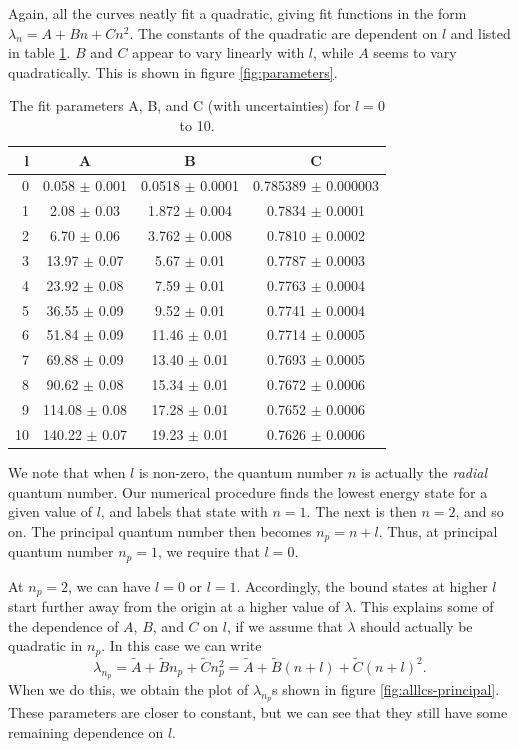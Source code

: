 \documentclass[12pt,twoside]{reedthesis}
\newcommand{\eqn}[1]{\begin{equation}#1\end{equation}}
\begin{document}
Again, all the curves neatly fit a quadratic, giving fit functions in the form $\lambda_n = A + B n + C n^2$. The constants of the quadratic are dependent on $l$ and listed in table \ref{tab:fitparams}. $B$ and $C$ appear to vary linearly with $l$, while $A$ seems to vary quadratically. This is shown in figure \ref{fig:parameters}.

\begin{table}[h]
	\centering
	\caption{The fit parameters A, B, and C (with uncertainties) for $l = 0$ to 10.}
	\label{tab:fitparams}
	\begin{tabular}{r|ccc}
		l	& A	 	& B	 	& C	 \\
		\hline
		0	& 0.058	$\pm$ 0.001	& 0.0518	$\pm$ 0.0001	& 0.785389	$\pm$ 0.000003\\
		1	& 2.08	$\pm$ 0.03	& 1.872	$\pm$ 0.004	& 0.7834	$\pm$ 0.0001\\
		2	& 6.70	$\pm$ 0.06	& 3.762	$\pm$ 0.008	& 0.7810	$\pm$ 0.0002\\
		3	& 13.97	$\pm$ 0.07	& 5.67	$\pm$ 0.01	& 0.7787	$\pm$ 0.0003\\
		4	& 23.92	$\pm$ 0.08	& 7.59	$\pm$ 0.01	& 0.7763	$\pm$ 0.0004\\
		5	& 36.55	$\pm$ 0.09	& 9.52	$\pm$ 0.01	& 0.7741	$\pm$ 0.0004\\
		6	& 51.84	$\pm$ 0.09	& 11.46	$\pm$ 0.01	& 0.7714	$\pm$ 0.0005\\
		7	& 69.88	$\pm$ 0.09	& 13.40	$\pm$ 0.01	& 0.7693	$\pm$ 0.0005\\
		8	& 90.62	$\pm$ 0.08	& 15.34	$\pm$ 0.01	& 0.7672	$\pm$ 0.0006\\
		9	& 114.08	$\pm$ 0.08	& 17.28	$\pm$ 0.01	& 0.7652	$\pm$ 0.0006\\
		10	& 140.22	$\pm$ 0.07	& 19.23	$\pm$ 0.01	& 0.7626	$\pm$ 0.0006
	\end{tabular}
\end{table}

We note that when $l$ is non-zero, the quantum number $n$ is actually the \emph{radial} quantum number. Our numerical procedure finds the lowest energy state for a given value of $l$, and labels that state with $n = 1$. The next is then $n = 2$, and so on. The principal quantum number then becomes $n_p = n + l$. Thus, at principal quantum number $n_p = 1$, we require that $l = 0$. 

At $n_p = 2$, we can have $l = 0$ or $l = 1$. Accordingly, the bound states at higher $l$ start further away from the origin at a higher value of $\lambda$. 
This explains some of the dependence of $A$, $B$, and $C$ on $l$, if we assume that $\lambda$ should actually be quadratic in $n_p$. In this case we can write
\eqn{
\lambda_{n_p} = \tilde{A} + \tilde{B} n_p + \tilde{C} n_p^2 = \tilde{A} + \tilde{B} (n + l) + \tilde{C} (n + l)^2\mbox{.}
}
When we do this, we obtain the plot of $\lambda_{n_p}$s shown in figure \ref{fig:alllcs-principal}. These parameters are closer to constant, but we can see that they still have some remaining dependence on $l$.
\end{document}
